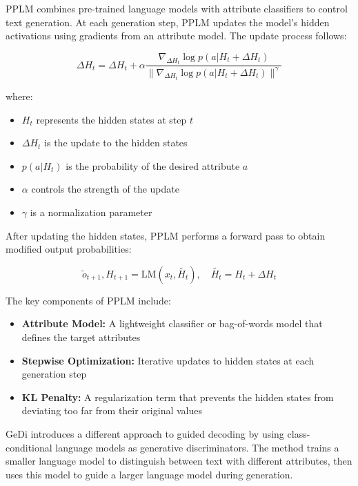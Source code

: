 PPLM combines pre-trained language models with attribute classifiers to control text generation. At each generation step, PPLM updates the model's hidden activations using gradients from an attribute model. The update process follows:

\begin{equation}
    \Delta H_t = \Delta H_t + \alpha \frac{\nabla_{\Delta H_t} \log p(a|H_t + \Delta H_t)}{\|\nabla_{\Delta H_t} \log p(a|H_t + \Delta H_t)\|^\gamma}
\end{equation}

where:
\begin{itemize}
    \item $H_t$ represents the hidden states at step $t$
    \item $\Delta H_t$ is the update to the hidden states
    \item $p(a|H_t)$ is the probability of the desired attribute $a$
    \item $\alpha$ controls the strength of the update
    \item $\gamma$ is a normalization parameter
\end{itemize}

After updating the hidden states, PPLM performs a forward pass to obtain modified output probabilities:

\begin{equation}
    \tilde{o}_{t+1}, H_{t+1} = \text{LM}(x_t, \tilde{H_t}), \quad \tilde{H_t} = H_t + \Delta H_t
\end{equation}

The key components of PPLM include:

\begin{itemize}
    \item \textbf{Attribute Model:} A lightweight classifier or bag-of-words model that defines the target attributes
    
    \item \textbf{Stepwise Optimization:} Iterative updates to hidden states at each generation step
    
    \item \textbf{KL Penalty:} A regularization term that prevents the hidden states from deviating too far from their original values
\end{itemize}

GeDi introduces a different approach to guided decoding by using class-conditional language models as generative discriminators. The method trains a smaller language model to distinguish between text with different attributes, then uses this model to guide a larger language model during generation.

